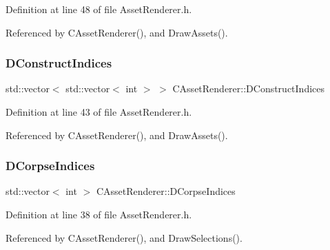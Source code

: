 Definition at line 48 of file Asset\+Renderer.\+h.



Referenced by C\+Asset\+Renderer(), and Draw\+Assets().

\hypertarget{classCAssetRenderer_a1790a8f6992efbb3fea59dde42a3cacb}{}\label{classCAssetRenderer_a1790a8f6992efbb3fea59dde42a3cacb} 
\subsubsection{\texorpdfstring{D\+Construct\+Indices}{DConstructIndices}}
{\footnotesize\ttfamily std\+::vector$<$ std\+::vector$<$ int $>$ $>$ C\+Asset\+Renderer\+::\+D\+Construct\+Indices\hspace{0.3cm}{\ttfamily [protected]}}



Definition at line 43 of file Asset\+Renderer.\+h.



Referenced by C\+Asset\+Renderer(), and Draw\+Assets().

\hypertarget{classCAssetRenderer_a572091e74ab9acfa21d2c7c55a966886}{}\label{classCAssetRenderer_a572091e74ab9acfa21d2c7c55a966886} 
\subsubsection{\texorpdfstring{D\+Corpse\+Indices}{DCorpseIndices}}
{\footnotesize\ttfamily std\+::vector$<$ int $>$ C\+Asset\+Renderer\+::\+D\+Corpse\+Indices\hspace{0.3cm}{\ttfamily [protected]}}



Definition at line 38 of file Asset\+Renderer.\+h.



Referenced by C\+Asset\+Renderer(), and Draw\+Selections().

\hypertarget{classCAssetRenderer_ab7e40b5fdcb49045250e0467d6318567}{}\label{classCAssetRenderer_ab7e40b5fdcb49045250e0467d6318567} 
